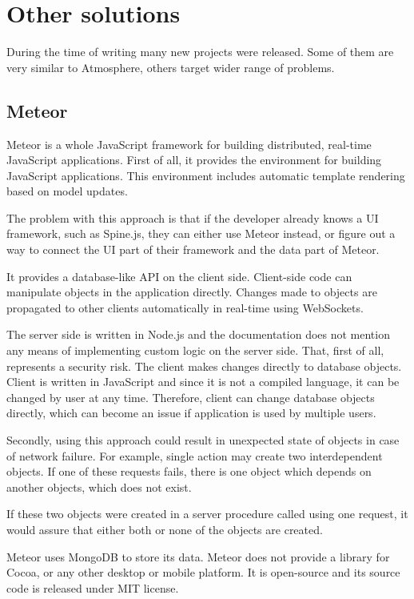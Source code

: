 \section{Other solutions}

During the time of writing many new projects were released. Some of them are very similar to Atmosphere, others target wider range of problems.


\subsection{Meteor}

Meteor \citep{meteor} is a whole JavaScript framework for building distributed, real-time JavaScript applications. First of all, it provides the environment for building JavaScript applications. This environment includes automatic template rendering based on model updates.

The problem with this approach is that if the developer already knows a UI framework, such as Spine.js, \citep{spinejs} they can either use Meteor instead, or figure out a way to connect the UI part of their framework and the data part of Meteor.

It provides a database-like API on the client side. Client-side code can manipulate objects in the application directly. Changes made to objects are propagated to other clients automatically in real-time using WebSockets.

The server side is written in Node.js and the documentation \citep{meteor_doc} does not mention any means of implementing custom logic on the server side. That, first of all, represents a security risk. The client makes changes directly to database objects. Client is written in JavaScript and since it is not a compiled language, it can be changed by user at any time. Therefore, client can change database objects directly, which can become an issue if application is used by multiple users.

Secondly, using this approach could result in unexpected state of objects in case of network failure. For example, single action may create two interdependent objects. If one of these requests fails, there is one object which depends on another objects, which does not exist.

If these two objects were created in a server procedure called using one request, it would assure that either both or none of the objects are created.

Meteor uses MongoDB to store its data. Meteor does not provide a library for Cocoa, or any other desktop or mobile platform. It is open-source and its source code is released under MIT license.

